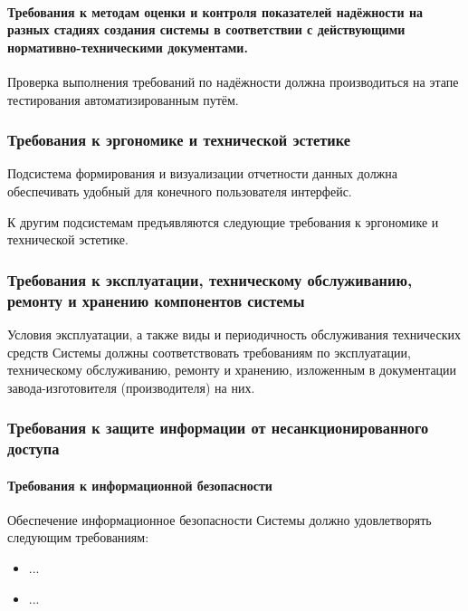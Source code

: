 \documentclass[a4paper, 12pt]{article}		%
\begin{document}
\paragraph{Требования к методам оценки и контроля показателей надёжности на разных стадиях создания системы в соответствии с действующими нормативно-техническими документами.\\}

Проверка выполнения требований по надёжности должна производиться на этапе тестирования автоматизированным путём.

\subsubsection{Требования к эргономике и технической эстетике}

Подсистема формирования и визуализации отчетности данных должна обеспечивать удобный для конечного пользователя интерфейс.

К другим подсистемам предъявляются следующие требования к эргономике и технической эстетике.

\subsubsection{Требования к эксплуатации, техническому обслуживанию, ремонту и хранению компонентов системы}

Условия эксплуатации, а также виды и периодичность обслуживания технических средств Системы должны соответствовать требованиям по эксплуатации, техническому обслуживанию, ремонту и хранению, изложенным в документации завода-изготовителя (производителя) на них.

\subsubsection{Требования к защите информации от несанкционированного доступа}

\paragraph{Требования к информационной безопасности\\}

Обеспечение информационное безопасности Системы должно удовлетворять следующим требованиям:
\begin{itemize}
\item ...
\item ...
\end{itemize}
\end{document}
